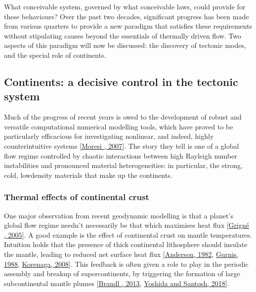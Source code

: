 \documentclass[letterpaper,10pt,english]{jupyterBook}
\begin{document}
\sphinxAtStartPar
What conceivable system, governed by what conceivable laws, could provide for these behaviours? Over the past two decades, significant progress has been made from various quarters to provide a new paradigm that satisfies these requirements without stipulating causes beyond the essentials of thermally driven flow. Two aspects of this paradigm will now be discussed: the discovery of tectonic modes, and the special role of continents.


\subsection{Continents: a decisive control in the tectonic system}
\label{\detokenize{content/chapter_01_background/main:continents-a-decisive-control-in-the-tectonic-system}}
\sphinxAtStartPar
Much of the progress of recent years is owed to the development of robust and versatile computational numerical modelling tools, which have proved to be particularly efficacious for investigating non\sphinxhyphen{}linear, and indeed, highly counter\sphinxhyphen{}intuitive systems {[}\hyperlink{cite.references:id382}{Moresi , 2007}{]}. The story they tell is one of a global flow regime controlled by chaotic interactions between high Rayleigh number instabilities and pronounced material heterogeneities: in particular, the strong, cold, low\sphinxhyphen{}density materials that make up the continents.


\subsubsection{Thermal effects of continental crust}
\label{\detokenize{content/chapter_01_background/main:thermal-effects-of-continental-crust}}
\sphinxAtStartPar
One major observation from recent geodynamic modelling is that a planet’s global flow regime needn’t necessarily be that which maximises heat flux {[}\hyperlink{cite.references:id301}{Grigné , 2005}{]}. A good example is the effect of continental crust on mantle temperatures. Intuition holds that the presence of thick continental lithosphere should insulate the mantle, leading to reduced net surface heat flux {[}\hyperlink{cite.references:id525}{Anderson, 1982}, \hyperlink{cite.references:id526}{Gurnis, 1988}, \hyperlink{cite.references:id472}{Korenaga, 2008}{]}. This feedback is often given a role to play in the periodic assembly and breakup of supercontinents, by triggering the formation of large sub\sphinxhyphen{}continental mantle plumes {[}\hyperlink{cite.references:id528}{Brandl , 2013}, \hyperlink{cite.references:id530}{Yoshida and Santosh, 2018}{]}.
\end{document}
